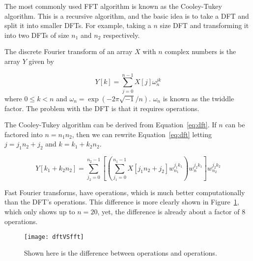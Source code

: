         The most commonly used FFT algorithm is known as the Cooley-Tukey algorithm.
        This is a recursive algorithm, and the basic idea is to take a DFT and split it
        into smaller DFTs. For example, taking a $n$ size DFT and transforming it into
        two DFTs of size $n_1$ and $n_2$ respectively.

        The discrete Fourier transform of an array $X$ with $n$ complex numbers is the array
        $Y$ given by

        \begin{equation}
            Y[k] = \sum_{j=0}^{n-1}X[j]\omega_n^{jk}
            \label{eq:dft}
        \end{equation}
        where $0\le k < n$ and $\omega_n=\exp\left( -2\pi\sqrt{-1}/n \right)$.
        $\omega_n$ is known as the twiddle factor. The problem
        with the DFT is that it requires  operations.

        The Cooley-Tukey algorithm can be derived from Equation~\ref{eq:dft}. If
        $n$ can be factored into $n=n_1n_2$, then we can rewrite
        Equation~\ref{eq:dft}
        letting $j=j_1n_2+j_2$ and $k=k_1+k_2n_2$.

        \begin{equation}
            Y[k_1+k_2n_2]=\sum_{j_2=0}^{n_2-1}\left[ \left( \sum_{j_1=0}^{n_1-1}
                X[j_1n_2+j_2]w_{n_1}^{j_1k_1} \right)w_n^{j_2k_1} \right]w_{n_2}^{j_2k_2}
            \end{equation}


            Fast Fourier transforms,
            have  operations, which is much better
            computationally than the DFT's  operations. This difference is more clearly shown in
            Figure~\ref{fig:dftVSfft}, which only shows up to $n=20$, yet, the difference is
            already about a factor of 8 operations.

            \begin{figure}[htbp!]
                \begin{center}
                    \texttt{[image: dftVSfft]}
                \end{center}
                \caption{Shown here is the difference between  operations and
                 operations.}
                \label{fig:dftVSfft}
            \end{figure}

